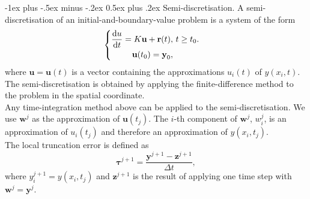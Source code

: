 \documentclass[10pt,landscape,a4paper]{article}
\makeatletter
\renewcommand{\section}{\@startsection{section}{1}{0mm}%
	{-1ex plus -.5ex minus -.2ex}%
	{0.5ex plus .2ex}%
	{\normalfont\large\bfseries}}
\makeatother
\begin{document}
\begin{multicols}{3}
	\section{Semi-discretisation.}
	A semi-discretisation of an initial-and-boundary-value problem is a system of the form
	\[
		\begin{cases}
			\begin{aligned}
				\dv{u}{t}=K\textbf{u}+\textbf{r}(t), & \ t\geq t_0. \\
				\textbf{u}(t_0)=\textbf{y}_0,        & 
			\end{aligned}
		\end{cases}
	\]
	where $ \textbf{u}=\textbf{u}(t) $ is a vector containing the approximations $ u_i(t) $ of $ y(x_i,t) $.\\
	The semi-discretisation is obtained by applying the finite-difference method to the problem in the spatial coordinate.\\
	Any time-integration method above can be applied to the semi-discretisation. We use $ \textbf{w}^j $ as the approximation of $ \textbf{u}(t_j) $.
	The $ i $-th component of $ \textbf{w}^j $, $ w_i^j $, is an approximation of $ u_i(t_j) $ and therefore an approximation of $ y(x_i,t_j) $.\\
	The local truncation error is defined as
	\[
		\bm{\tau}^{j+1}=\frac{\textbf{y}^{j+1}-\textbf{z}^{j+1}}{\Delta t},
	\]
	where $ y_i^{j+1}=y(x_i,t_j) $ and $ \textbf{z}^{j+1} $ is the result of applying one time step with $ \textbf{w}^j=\textbf{y}^j $.
	
	\newpage
\end{multicols}
\end{document}
